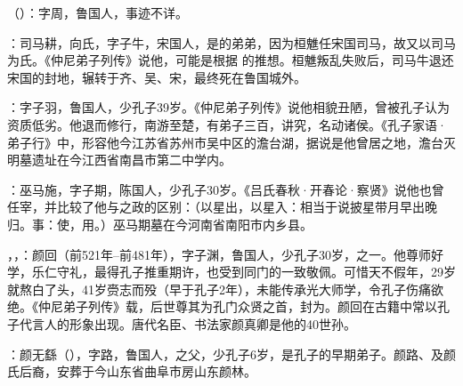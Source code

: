 （）：字周，鲁国人，事迹不详。

：司马耕，向氏，字子牛，宋国人，是的弟弟，因为桓魋任宋国司马，故又以司马为氏。《仲尼弟子列传》说他，可能是根据  的推想。桓魋叛乱失败后，司马牛退还宋国的封地，辗转于齐、吴、宋，最终死在鲁国城外。

：字子羽，鲁国人，少孔子39岁。《仲尼弟子列传》说他相貌丑陋，曾被孔子认为资质低劣。他退而修行，南游至楚，有弟子三百，讲究，名动诸侯。《孔子家语·弟子行》中，形容他今江苏省苏州市吴中区的澹台湖，据说是他曾居之地，澹台灭明墓遗址在今江西省南昌市第二中学内。

：巫马施，字子期，陈国人，少孔子30岁。《吕氏春秋·开春论·察贤》说他也曾任宰，并比较了他与之政的区别：（以星出，以星入：相当于说披星带月早出晚归。事：使，用。）巫马期墓在今河南省南阳市内乡县。

，，：颜回（前521年--前481年），字子渊，鲁国人，少孔子30岁，之一。他尊师好学，乐仁守礼，最得孔子推重期许，也受到同门的一致敬佩。可惜天不假年，29岁就熬白了头，41岁赍志而殁（早于孔子2年），未能传承光大师学，令孔子伤痛欲绝。《仲尼弟子列传》载，后世尊其为孔门众贤之首，封为。颜回在古籍中常以孔子代言人的形象出现。唐代名臣、书法家颜真卿是他的40世孙。%

：颜无繇（），字路，鲁国人，之父，少孔子6岁，是孔子的早期弟子。颜路、及颜氏后裔，安葬于今山东省曲阜市房山东颜林。

